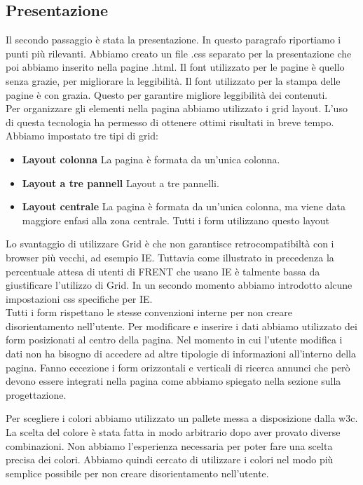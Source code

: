 \documentclass[1_relazione.tex]{subfiles}
\begin{document}
\subsection{Presentazione}
Il secondo passaggio \`{e} stata la presentazione. In questo paragrafo riportiamo i punti pi\`{u} rilevanti. Abbiamo creato un file .css separato per la presentazione che poi abbiamo inserito nella pagine .html. Il font utilizzato per le pagine \`{e} quello senza grazie, per migliorare la leggibilit\`{a}. Il font utilizzato per la stampa delle pagine \`{e} con grazia. Questo per garantire migliore leggibilit\`{a} dei contenuti.  \\
Per organizzare gli elementi nella pagina abbiamo utilizzato i grid layout. L'uso di questa tecnologia ha permesso di ottenere ottimi risultati in breve tempo. Abbiamo impostato tre tipi di grid:
\begin{itemize}
\item \textbf{Layout colonna}  La pagina \`{e} formata da un'unica colonna.
\item \textbf{Layout a tre pannell} Layout a tre pannelli.
\item \textbf{Layout centrale} La pagina \`{e} formata da un'unica colonna, ma viene data maggiore enfasi alla zona centrale. Tutti i form utilizzano questo layout
\end{itemize}

Lo svantaggio di utilizzare Grid \`{e} che non garantisce retrocompatibilt\`{a} con i browser pi\`{u} vecchi, ad esempio IE. Tuttavia come illustrato in precedenza la percentuale attesa di utenti di FRENT che usano IE \`{e} talmente bassa da giustificare l'utilizzo di Grid. In un secondo momento abbiamo introdotto alcune impostazioni css specifiche per IE. \\
Tutti i form rispettano le stesse convenzioni interne per non creare disorientamento nell'utente. Per modificare e inserire i dati abbiamo utilizzato dei form posizionati al centro della pagina. Nel momento in cui l'utente modifica i dati non ha bisogno di accedere ad altre tipologie di informazioni all'interno della pagina. Fanno eccezione i form orizzontali e verticali di ricerca annunci che per\`{o} devono essere integrati nella pagina come abbiamo spiegato nella sezione sulla progettazione.



Per scegliere i colori abbiamo utilizzato un pallete messa a disposizione dalla w3c. La scelta del colore \`{e} stata fatta in modo arbitrario dopo aver provato diverse combinazioni. Non abbiamo l'esperienza necessaria per poter fare una scelta precisa dei colori. Abbiamo quindi cercato di utilizzare i colori nel modo pi\`{u} semplice possibile per non creare disorientamento nell'utente.
\end{document}
